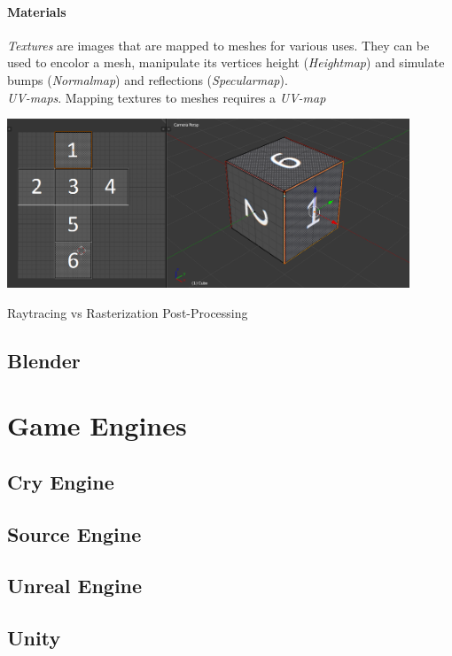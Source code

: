 \paragraph{Materials} \textit{Textures} are images that are mapped to meshes for various uses. They can be used to encolor a mesh, manipulate its vertices height (\textit{Heightmap})\cite{UnityDocHeightmap} and simulate bumps (\textit{Normalmap}\cite{UnityDocNormalmap}\cite{Cohen:1998:AS:280814.280832}\cite{745285}) and reflections (\textit{Specularmap})\cite{UnityDocSpecularmap}.\\
\textit{UV-maps}.
Mapping textures to meshes requires a \textit{UV-map}

\begin{center}
\noindent\includegraphics[width=12cm]{tex/img/ch03/CubeUVMapping.png}
\label{fig:3d-cube-uv-mapping}
\end{center}

Raytracing \cite{Plemenos2010} vs Rasterization
Post-Processing


\subsection{Blender}

\section{Game Engines}

\subsection{Cry Engine}

\subsection{Source Engine}

\subsection{Unreal Engine}

\subsection{Unity}
